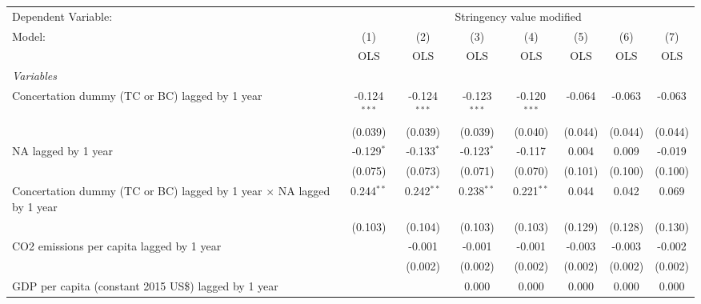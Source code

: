 
\begingroup
\centering
\begin{tabular}{lccccccc}
   \toprule
   Dependent Variable: & \multicolumn{7}{c}{Stringency value modified}\\
   Model:                                                                       & (1)            & (2)            & (3)            & (4)            & (5)     & (6)     & (7)\\  
                                                                                &  OLS           & OLS            & OLS            & OLS            & OLS     & OLS     & OLS\\  
   \midrule
   \emph{Variables}\\
   Concertation dummy (TC or BC) lagged by 1 year                               & -0.124$^{***}$ & -0.124$^{***}$ & -0.123$^{***}$ & -0.120$^{***}$ & -0.064  & -0.063  & -0.063\\   
                                                                                & (0.039)        & (0.039)        & (0.039)        & (0.040)        & (0.044) & (0.044) & (0.044)\\   
   NA lagged by 1 year                                                          & -0.129$^{*}$   & -0.133$^{*}$   & -0.123$^{*}$   & -0.117         & 0.004   & 0.009   & -0.019\\   
                                                                                & (0.075)        & (0.073)        & (0.071)        & (0.070)        & (0.101) & (0.100) & (0.100)\\   
   Concertation dummy (TC or BC) lagged by 1 year $\times$ NA lagged by 1 year  & 0.244$^{**}$   & 0.242$^{**}$   & 0.238$^{**}$   & 0.221$^{**}$   & 0.044   & 0.042   & 0.069\\   
                                                                                & (0.103)        & (0.104)        & (0.103)        & (0.103)        & (0.129) & (0.128) & (0.130)\\   
   CO2 emissions per capita lagged by 1 year                                    &                & -0.001         & -0.001         & -0.001         & -0.003  & -0.003  & -0.002\\   
                                                                                &                & (0.002)        & (0.002)        & (0.002)        & (0.002) & (0.002) & (0.002)\\   
   GDP per capita (constant 2015 US\$) lagged by 1 year                         &                &                & 0.000          & 0.000          & 0.000   & 0.000   & 0.000\\   

\end{tabular}
